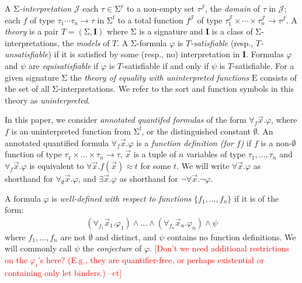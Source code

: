 \documentclass[runningheads,a4paper]{llncs}
\let\oldSigma=\Sigma
\def\Sigma{\mathrm{\oldSigma}}
\newcommand{\teq}{\approx}
\newcommand{\I}{\mathcal{J}} %
\newcommand{\ssorts}[1]{#1^\mathrm{y}}
\newcommand{\sfuns}[1]{#1^\mathrm{f}}
\newcommand{\forallf}[1]{\forall_{#1}}
\newcommand{\fnull}{\emptyset}
\newcommand{\rem}[1]{\textcolor{red}{[#1]}}
\newcommand{\ct}[1]{\rem{#1 --ct}}
\newcommand{\Mo}{\mathbf{I}}
\newcommand{\euf}{\ensuremath{\mathrm{E}}\xspace}
\begin{document}
A \emph{$\Sigma$-interpretation $\I$} %
each $\tau \in \ssorts{\Sigma}$ to a non-empty set $\tau^\I$,
the \emph{domain} of $\tau$ in $\I$;
each $f$ of type $\tau_1 \cdots \tau_n \rightarrow \tau$ in $\sfuns{\Sigma}$ 
to a total function $f^\I$ of type $\tau_1^\I \times \cdots \times \tau_n^\I \rightarrow \tau^\I$.
A \emph{theory} is a pair $T = (\Sigma, \Mo)$ where 
$\Sigma$ is a signature and  $\Mo$ is a class of $\Sigma$-interpretations,
the \emph{models} of $T$.
A $\Sigma$-formula $\varphi$ is 
\emph{$T$-satisfiable} (resp., \emph{$T$-unsatisfiable}) 
if it is satisfied by some (resp., no) interpretation in $\Mo$.
Formulas $\varphi$ and $\psi$ are \emph{equisatisfiable} if
$\varphi$ is $T$-satisfiable if and only if $\psi$ is $T$-satisfiable.
For a given signature $\Sigma$
the \emph{theory of equality with uninterpreted functions} \euf
consists of the set of all $\Sigma$-interpretations.
We refer to the sort and function symbols in this theory as \emph{uninterpreted}.

In this paper, we consider \emph{annotated quantifed formulas} of the form $\forallf{f} \vec x. \varphi$, 
where $f$ is an uninterpreted function from $\sfuns{\Sigma}$, or the distinguished constant $\fnull$.
An annotated quantified formula $\forallf{f} \vec x. \varphi$ is a \emph{function definition (for $f$)} if 
$f$ is a non-$\fnull$ function of type $\tau_1 \times \ldots \times \tau_n \rightarrow \tau$, 
$\vec x$ is a tuple of $n$ variables of type $\tau_1, \ldots, \tau_n$
and $\forallf{f} \vec x. \varphi$ is equivalent to $\forall \vec x. f( \vec x ) \teq t$ for some $t$.
We will write $\forall \vec x. \varphi$ as shorthand for $\forallf{\fnull} \vec x. \varphi$,
and $\exists \vec x. \varphi$ as shorthand for $\neg \forall \vec x. \neg \varphi$.

\begin{definition}
A formula $\varphi$ is \emph{well-defined with respect to functions} $\{ f_1, \ldots, f_n \}$ if it is of the form:
\begin{eqnarray} \label{eq:wdf}
(\forallf{f_1} \vec x_1. \varphi_1) \wedge \ldots \wedge (\forallf{f_n} \vec x_n. \varphi_n) \wedge \psi
\end{eqnarray}
where $f_1, \ldots, f_n$ are not $\fnull$ and distinct, 
and $\psi$ contains no function definitions.
We will commonly call $\psi$ the \emph{conjecture} of $\varphi$.
\ct{Don't we need additional restrictions on the $\varphi_i$'s here?
(E.g., they are quantifier-free, or perhaps existential or containing only let binders.)}
\end{definition}
\end{document}

